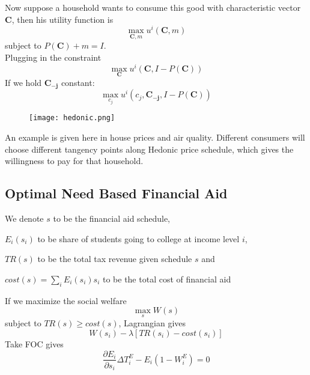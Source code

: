 \documentclass[twocolumn, fleqn]{article}
\begin{document}
		Now suppose a household wants to consume this good with characteristic vector $\mathbf{C}$, then his utility function is 		
		\[
		\max_{\mathbf C, m} u^i (\mathbf C, m)
		\]
		subject to \(P(\mathbf C) + m = I\).\\[6pt]
		Plugging in the constraint
		\[
		\max_{\mathbf{C}} u^i (\mathbf{C}, I - P(\mathbf{C}))
		\]
		If we hold $\mathbf{C_{-j}}$ constant:
		\[
		\max_{c_j} u^i (c_j, \mathbf{C_{-j}}, I - P(\mathbf{C}))
		\]
		 
		\begin{figure}[H]
			\center
			\texttt{[image: hedonic.png]}
		\end{figure}
		An example is given here in house prices and air quality. Different consumers will choose different tangency points along Hedonic price schedule, which gives the willingness to pay for that household. 
		
		\subsection{Optimal Need Based Financial Aid}
		We denote $s$ to be the financial aid schedule, 
		
		$E_i(s_i)$ to be  share of students going to college at income level $i$, 
		
		$TR(s)$ to be the total tax revenue given schedule $s$ and 
		
		$cost(s)= \sum_i E_i (s_i)s_i$ to be the total cost of financial aid 
		
		If we maximize the social welfare 
		\[\max_{s} W(s)\]
		subject to \( TR(s) \geq cost(s)\), Lagrangian gives
		\[ W(s_i) - \lambda [TR(s_i)- cost(s_i)]\]
		Take FOC gives 
		\[ \frac{\partial E_i}{\partial s_i} \Delta T_i^E - E_i (1-W_i^E)=0\]
		
		
		
\end{document}
